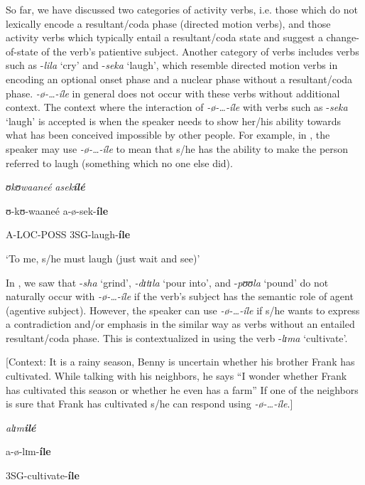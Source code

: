 \documentclass[output=paper,newtxmath,modfonts,nonflat,draftmode]{langsci/langscibook}
\begin{document}
So far, we have discussed two categories of activity verbs, i.e. those which do not lexically encode a resultant/coda phase (directed motion verbs), and those activity verbs which typically entail a resultant/coda state and suggest a change-of-state of the verb’s patientive subject. Another category of verbs includes verbs such as -\textit{lila} ‘cry’ and -\textit{seka} ‘laugh’, which resemble directed motion verbs in encoding an optional onset phase and a nuclear phase without a resultant/coda phase. \textit{-ø}\textit{-…-íle} in general does not occur with these verbs without additional context. The context where the interaction of \textit{-ø}\textit{-…-íle} with verbs such as -\textit{seka} ‘laugh’ is accepted is when the speaker needs to show her/his ability towards what has been conceived impossible by other people. For example, in , the speaker may use \textit{-ø}\textit{-…-íle} to mean that s/he has the ability to make the person referred to laugh (something which no one else did). 

\ea \label{ex:kanijo:29}
\ea
\textit{ʊk}\textit{ʊwaaneé}    \textit{asek}\textbf{\textit{ílé}}

  ʊ-kʊ-waaneé a-ø-sek-\textbf{íle}

   A-LOC-POSS  3SG-laugh-\textbf{íle}

  ‘To me, s/he must laugh (just wait and see)’
\z
\z

In , we saw that -\textit{sha} ‘grind’, \textit{-dɪ}\textit{tɪ}\textit{la} ‘pour into’, and -\textit{pʊʊ}\textit{la} ‘pound’ do not naturally occur with \textit{-ø}\textit{-…-íle} if the verb’s subject has the semantic role of agent (agentive subject). However, the speaker can use \textit{-ø}\textit{-…-íle} if s/he wants to express a contradiction and/or emphasis in the similar way as verbs without an entailed resultant/coda phase. This is contextualized in  using the verb -\textit{lɪ}\textit{ma} ‘cultivate’. 

\ea \label{ex:kanijo:30}
\ea{} 
[Context: It is a rainy season, Benny is uncertain whether his brother Frank has cultivated. While talking with his neighbors, he says “I wonder whether Frank has cultivated this season or whether he even has a farm” If one of the neighbors is sure that Frank has cultivated s/he can respond using \textit{-ø}\textit{-…-íle}.]

\textit{alɪ}\textit{m}\textbf{\textit{ilé}}

a-ø-lɪm-\textbf{íle}

3SG-cultivate-\textbf{íle}
\end{document}

